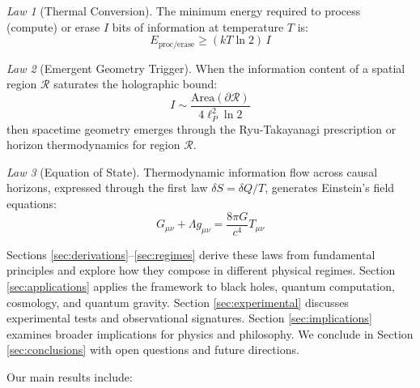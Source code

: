 \documentclass[11pt,a4paper]{article}
\theoremstyle{plain}
\theoremstyle{definition}
\theoremstyle{remark}
\newtheorem{law}{Law}
\begin{document}
\begin{law}[Thermal Conversion]
The minimum energy required to process (compute) or erase $I$ bits of information at temperature $T$ is:
\begin{equation}
E_{\text{proc/erase}} \geq (kT\ln 2)\,I
\label{eq:law2}
\end{equation}
\end{law}

\begin{law}[Emergent Geometry Trigger]
When the information content of a spatial region $\mathcal{R}$ saturates the holographic bound:
\begin{equation}
I \sim \frac{\text{Area}(\partial\mathcal{R})}{4\ell_P^2\ln 2}
\label{eq:law3}
\end{equation}
then spacetime geometry emerges through the Ryu-Takayanagi prescription or horizon thermodynamics for region $\mathcal{R}$.
\end{law}

\begin{law}[Equation of State]
Thermodynamic information flow across causal horizons, expressed through the first law $\delta S = \delta Q/T$, generates Einstein's field equations:
\begin{equation}
G_{\mu\nu} + \Lambda g_{\mu\nu} = \frac{8\pi G}{c^4}T_{\mu\nu}
\label{eq:law4}
\end{equation}
\end{law}

Sections \ref{sec:derivations}--\ref{sec:regimes} derive these laws from fundamental principles and explore how they compose in different physical regimes. Section \ref{sec:applications} applies the framework to black holes, quantum computation, cosmology, and quantum gravity. Section \ref{sec:experimental} discusses experimental tests and observational signatures. Section \ref{sec:implications} examines broader implications for physics and philosophy. We conclude in Section \ref{sec:conclusions} with open questions and future directions.

Our main results include:
\end{document}
